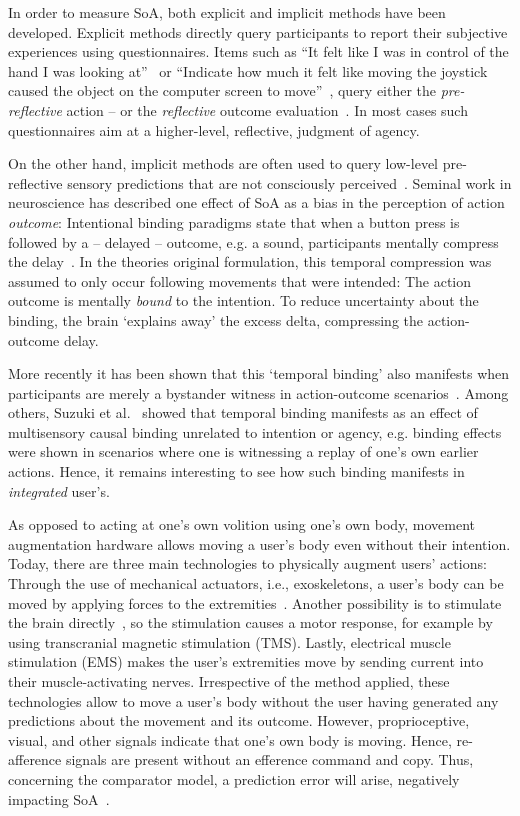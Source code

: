 In order to measure SoA, both explicit and implicit methods have been developed. Explicit methods directly query participants to report their subjective experiences using questionnaires. Items such as ``It felt like I was in control of the hand I was looking at''~\cite{Haggard2002-sz} or ``Indicate how much it felt like moving the joystick caused the object on the computer screen to move''~\cite{Ebert2010-lu}, query either the \textit{pre-reflective} action -- or the \textit{reflective} outcome evaluation~\cite{Moore2012-dk}. In most cases such questionnaires aim at a higher-level, reflective, judgment of agency.

On the other hand, implicit methods are often used to query low-level pre-reflective sensory predictions that are not consciously perceived~\cite{Moore2016-ub, Limerick2014-un, Moore2012-ic}. Seminal work in neuroscience has described one effect of SoA as a bias in the perception of action \textit{outcome}: Intentional binding paradigms state that when a button press is followed by a -- delayed -- outcome, e.g. a sound, participants mentally compress the delay~\cite{Haggard2002-sz}. In the theories original formulation, this temporal compression was assumed to only occur following movements that were intended: The action outcome is mentally \textit{bound} to the intention. To reduce uncertainty about the binding, the brain `explains away' the excess delta, compressing the action-outcome delay.

More recently it has been shown that this `temporal binding' also manifests when participants are merely a bystander witness in action-outcome scenarios~\cite{Suzuki2019-pi, Gutzeit2023-ei}. Among others, Suzuki et al.~\citep{Suzuki2019-pi} showed that temporal binding manifests as an effect of multisensory causal binding unrelated to intention or agency, e.g. binding effects were shown in scenarios where one is witnessing a replay of one's own earlier actions. Hence, it remains interesting to see how such binding manifests in \textit{integrated} user's.

As opposed to acting at one's own volition using one's own body, movement augmentation hardware allows moving a user's body even without their intention. Today, there are three main technologies to physically augment users' actions: Through the use of mechanical actuators, i.e., exoskeletons, a user's body can be moved by applying forces to the extremities~\cite{Kuhn2013-ls}. Another possibility is to stimulate the brain directly~\cite{Haggard2002-sz}, so the stimulation causes a motor response, for example by using transcranial magnetic stimulation (TMS). Lastly, electrical muscle stimulation (EMS) makes the user's extremities move by sending current into their muscle-activating nerves. Irrespective of the method applied, these technologies allow to move a user's body without the user having generated any predictions about the movement and its outcome. However, proprioceptive, visual, and other signals indicate that one's own body is moving. Hence, re-afference signals are present without an efference command and copy. Thus, concerning the comparator model, a prediction error will arise, negatively impacting SoA~\cite{Wen2020-dk}.

